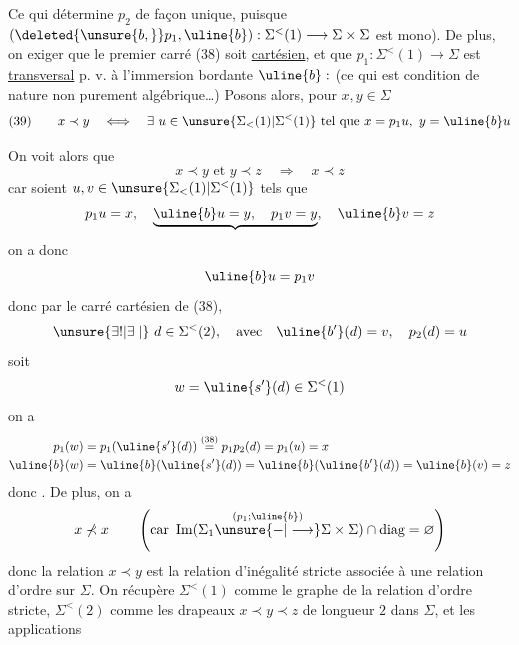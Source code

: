 Ce qui détermine $p_2$ de façon unique, puisque
$(\deleted{\unsure{b,}}p_1,\uline{b}):\Sigma^{<}(1)\longrightarrow\Sigma\times\Sigma$ est mono).
De plus, on  exiger que le premier carré
(38) soit \uline{cartésien}, et que $p_1:\Sigma^{<}(1)\longrightarrow\Sigma$
est \uline{transversal} p. v. à l'immersion bordante
$\uline{b}:$  (ce qui est  condition de
nature non purement algébrique\ldots)
Posons alors, pour $x,y\in\Sigma$
\[
(39)\qquad x\prec y\quad\Longleftrightarrow\quad
\exists\ u\in\unsure{\Sigma_{<}(1)|\Sigma^{<}(1)}\text{ tel que }x=p_1u,\ y=\uline{b}u
\]

On voit alors que
\[
x\prec y\text{ et }y\prec z\quad\Longrightarrow\quad x\prec z
\]
car soient $u,v\in\unsure{\Sigma_{<}(1)|\Sigma^{<}(1)}$ tels que
\[
p_1u=x,\quad\underbrace{\uline{b}u=y,\quad p_1v=y},\quad\uline{b}v=z
\]
on a donc
\[
\uline{b}u=p_1v
\]
donc par le carré cartésien de (38), 
\[
\unsure{\exists!|\exists\mid}\ d\in\Sigma^{<}(2),\quad\text{avec}\quad\uline{b'}(d)=v,\quad p_2(d)=u
\]
soit
\[
w=\uline{s'}(d)\in\Sigma^{<}(1)
\]
on a
\[
\begin{aligned}
p_1(w)&=p_1(\uline{s'}(d))\overset{(38)}{=}p_1p_2(d)=p_1(u)=x\\
\uline{b}(w)&=\uline{b}(\uline{s'}(d))=\uline{b}(\uline{b'}(d))=\uline{b}(v)=z
\end{aligned}
\]
donc
.
De plus, on a
\[
x\not\prec x\qquad\left(\text{car }\operatorname{Im}(\Sigma_1\overset{(p_1;\uline{b})}{\unsure{-|\longrightarrow}}\Sigma\times\Sigma)\cap\text{diag}=\varnothing\right)
\]
donc la relation $x\prec y$ est la relation
d'inégalité stricte associée à une relation
d'ordre sur $\Sigma$. On récupère $\Sigma^{<}(1)$ comme
le graphe de la relation d'ordre stricte,
$\Sigma^{<}(2)$ comme les drapeaux $x\prec y\prec z$ de
longueur $2$ dans $\Sigma$, et les applications

